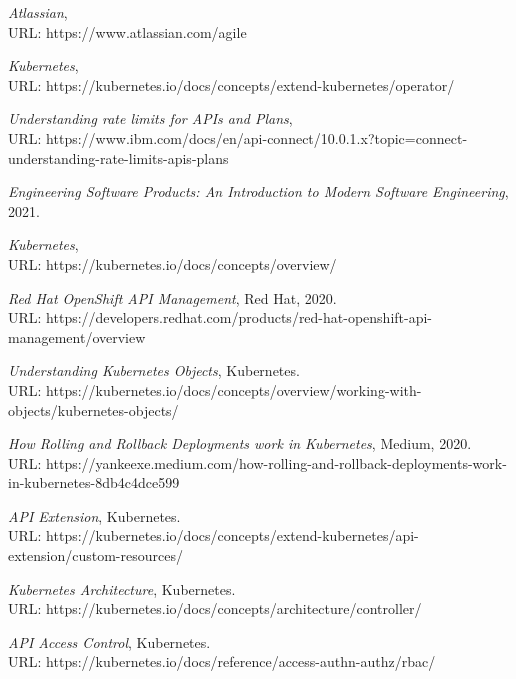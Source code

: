 \documentclass{article}
\begin{document}
\clearpage
\begin{thebibliography}{9}


\emph{Atlassian}, \\URL: https://www.atlassian.com/agile 

\emph{Kubernetes}, \\URL: https://kubernetes.io/docs/concepts/extend-kubernetes/operator/

\emph{Understanding rate limits for APIs and Plans}, \\URL: https://www.ibm.com/docs/en/api-connect/10.0.1.x?topic=connect-understanding-rate-limits-apis-plans

\emph{Engineering Software Products: An Introduction to Modern Software Engineering}, 2021.
  
\emph{Kubernetes}, \\URL: https://kubernetes.io/docs/concepts/overview/  

\emph{Red Hat OpenShift API Management}, Red Hat, 2020. \\URL: https://developers.redhat.com/products/red-hat-openshift-api-management/overview

\emph{Understanding Kubernetes Objects}, Kubernetes. \\URL: https://kubernetes.io/docs/concepts/overview/working-with-objects/kubernetes-objects/
  
\emph{How Rolling and Rollback Deployments work in Kubernetes}, Medium, 2020. \\URL: https://yankeexe.medium.com/how-rolling-and-rollback-deployments-work-in-kubernetes-8db4c4dce599 

\emph{API Extension}, Kubernetes. \\URL: https://kubernetes.io/docs/concepts/extend-kubernetes/api-extension/custom-resources/ 
  
\emph{Kubernetes Architecture}, Kubernetes. \\URL: https://kubernetes.io/docs/concepts/architecture/controller/ 
  
\emph{API Access Control}, Kubernetes. \\ URL: https://kubernetes.io/docs/reference/access-authn-authz/rbac/  


\end{thebibliography}
\end{document}
